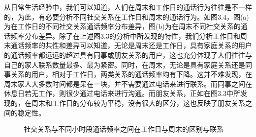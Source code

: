 从日常生活经验中，我们可以知道，人们在周末和工作日的通话行为往往是不一样的，为此，有必要分析不同社交关系在工作日和周末的通话行为。如图3.4，图(a)为在工作日的不同社交关系通话频率分布差异，图(b)为在周末不同社交关系的通话频率分布差异。除了在上述图3.3的分析中所发现的特性，我们分析工作日和周末通话频率的共性和差异可以知道，无论是周末还是工作日，具有家庭关系的用户的通话频率都远远的超过具有同事或朋友关系的用户，这也充分体现了人们往往与自己的家人联系数量最多、最为紧密。同时，在周末，无论是具有家庭关系还是同事关系的用户，相对于工作日，两类关系的通话频率均有下降。这并不难发现，在周末家人大多数时间都是呆在一块，并不需要通过电话来进行联系。而同事之间在休息日若无工作，则很少通过电话来进行沟通。而朋友关系，正如在图3.3中所发现的，在周末和工作日的分布较为平稳，没有很大的区分，这也反映了朋友关系之间的稳定性。


\begin{figure}[!ht]
    \centering
    \hspace{7em} %
    \caption{社交关系与不同小时段通话频率之间在工作日与周末的区别与联系}
    \label{fig-sub}
\end{figure}

